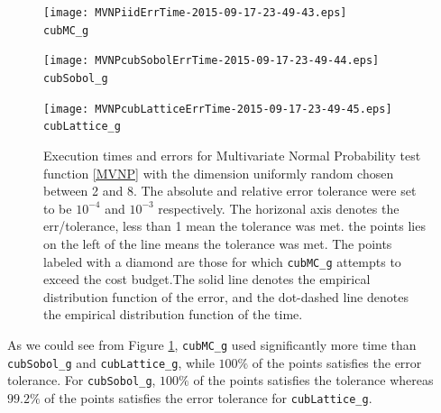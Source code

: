 \documentclass{iitthesis}
\theoremstyle{definition}
\begin{document}
\begin{figure}
\centering
\begin{minipage}{9cm} \centering \texttt{[image: MVNPiidErrTime-2015-09-17-23-49-43.eps]} \\ {\tt cubMC\_g}  \end{minipage}
\begin{minipage}{7cm} \centering \texttt{[image: MVNPcubSobolErrTime-2015-09-17-23-49-44.eps]} \\  {\tt cubSobol\_g}\end{minipage}
\begin{minipage}{7cm} \centering \texttt{[image: MVNPcubLatticeErrTime-2015-09-17-23-49-45.eps]} \\ {\tt cubLattice\_g} \end{minipage}
\caption{Execution times and errors for Multivariate Normal Probability test function \eqref{MVNP} with the dimension uniformly random chosen between 2 and 8. The absolute and relative error tolerance were set to be $10^{-4}$ and $10^{-3}$ respectively. The horizonal axis denotes the err/tolerance, less than 1 mean the tolerance was met. the points lies on the left of the line means the tolerance was met. The points labeled with a diamond are those for which  {\tt cubMC\_g}  attempts to exceed the cost budget.The solid line denotes the empirical distribution function of the error, and the dot-dashed line denotes the empirical distribution function of the time.\label{fig:MVNPTestFun1} }
\end{figure}
As we could see from Figure \ref{fig:MVNPTestFun1}, {\tt cubMC\_g} used significantly more time than {\tt cubSobol\_g} and {\tt cubLattice\_g}, while $100\%$ of the points satisfies the error tolerance. For {\tt cubSobol\_g}, $100\%$ of the points satisfies the tolerance whereas $99.2\%$ of the points satisfies the error tolerance for {\tt cubLattice\_g}.


%
\end{document}
